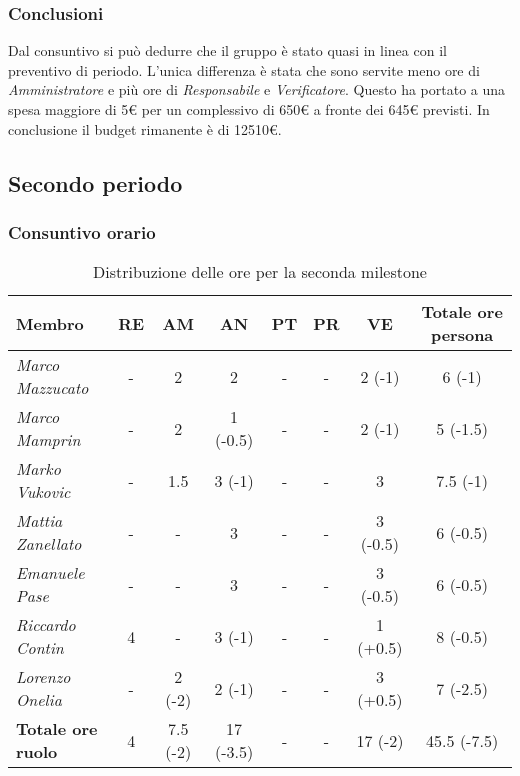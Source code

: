 \subsubsection{Conclusioni}
Dal consuntivo si può dedurre che il gruppo è stato quasi in linea con il preventivo di periodo.
L'unica differenza è stata che sono servite meno ore di \textit{Amministratore} e più
ore di \textit{Responsabile} e \textit{Verificatore}. Questo ha portato a una spesa maggiore di 5€ per un
complessivo di 650€ a fronte dei 645€ previsti.
In conclusione il budget rimanente è di \num{12510}€.



\subsection{Secondo periodo}

\subsubsection{Consuntivo orario}
\begin{table}[!ht]
    \centering
    \begin{tabular}{|l|c|c|c|c|c|c|c|}
    \hline
    \textbf{Membro} & \multicolumn{1}{c|}{\textbf{RE}} & \multicolumn{1}{c|}{\textbf{AM}} & \multicolumn{1}{c|}{\textbf{AN}} & \multicolumn{1}{c|}{\textbf{PT}} & \multicolumn{1}{c|}{\textbf{PR}} & \multicolumn{1}{c|}{\textbf{VE}} & \multicolumn{1}{c|}{\textbf{Totale ore persona}} \\ \hline
    \textit{Marco Mazzucato}  & -      & 2            & 2          & - & - & 2 (-1)        & 6 (-1)         \\ \hline
    \textit{Marco Mamprin}    & -      & 2            & 1 (-0.5)   & - & - & 2 (-1)        & 5 (-1.5)       \\ \hline
    \textit{Marko Vukovic}    & -      & 1.5          & 3 (-1)     & - & - & 3             & 7.5 (-1)       \\ \hline
    \textit{Mattia Zanellato} & -      & -            & 3          & - & - & 3 (-0.5)      & 6 (-0.5)       \\ \hline
    \textit{Emanuele Pase}    & -      & -            & 3          & - & - & 3 (-0.5)      & 6 (-0.5)       \\ \hline
    \textit{Riccardo Contin}  & 4      & -            & 3 (-1)     & - & - & 1 (+0.5)      & 8 (-0.5)       \\ \hline
    \textit{Lorenzo Onelia}   & -      & 2 (-2)       & 2 (-1)     & - & - & 3 (+0.5)      & 7 (-2.5)       \\ \hline
    \textbf{Totale ore ruolo} & 4      & 7.5 (-2)     & 17 (-3.5)  & - & - & 17 (-2)       & 45.5 (-7.5)    \\ \hline
    \end{tabular}
    \caption{Distribuzione delle ore per la seconda milestone}
\end{table}

